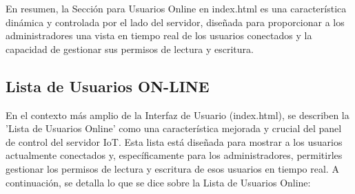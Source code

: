 \documentclass{report}
\begin{document}
En resumen, la Sección para Usuarios Online en index.html es una característica dinámica y controlada por el lado del servidor, 
diseñada para proporcionar a los administradores una vista en tiempo real de los usuarios conectados y la capacidad de gestionar 
sus permisos de lectura y escritura.

\subsection{Lista de Usuarios ON-LINE}
En el contexto más amplio de la Interfaz de Usuario (index.html), se  describen la 'Lista de Usuarios Online' como una 
característica mejorada y crucial del panel de control del servidor IoT. Esta lista está diseñada para mostrar a los usuarios 
actualmente conectados y, específicamente para los administradores, permitirles gestionar los permisos de lectura y escritura de 
esos usuarios en tiempo real.
A continuación, se detalla lo que se  dice sobre la Lista de Usuarios Online:
\end{document}

